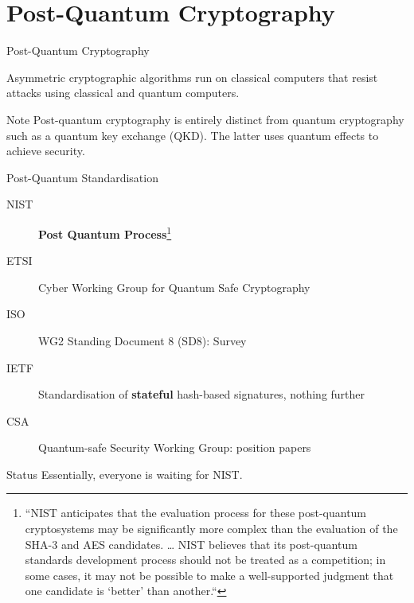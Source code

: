 \documentclass[xcolor=table,10pt,aspectratio=169]{beamer}
\begin{document}
\section{Post-Quantum Cryptography}
\label{sec:orgc3eb10c}
\begin{frame}[label={sec:org4dce0c8}]{Post-Quantum Cryptography}
\begin{definition}
Asymmetric cryptographic algorithms run on classical computers that resist attacks using classical and quantum computers.
\end{definition}

\pause

\begin{alertblock}{Note}
Post-quantum cryptography is entirely distinct from quantum cryptography such as a quantum key exchange (QKD). The latter uses quantum effects to achieve security.
\end{alertblock}
\end{frame}

\begin{frame}[label={sec:org1951ab1}]{Post-Quantum Standardisation}
\begin{description}
\item[{NIST}] \textbf{Post Quantum {\color{lightgray}{Competition} }Process}\footnote{“NIST anticipates that the evaluation process for these post-quantum cryptosystems may be significantly more complex than the evaluation of the SHA-3 and AES candidates. … NIST believes that its post-quantum standards development process should not be treated as a competition; in some cases, it may not be possible to make a well-supported judgment that one candidate is ‘better’ than another.“}
\item[{ETSI}] Cyber Working Group for Quantum Safe Cryptography
\item[{ISO}] WG2 Standing Document 8 (SD8): Survey
\item[{IETF}] Standardisation of \textbf{stateful} hash-based signatures, nothing further
\item[{CSA}] Quantum-safe Security Working Group: position papers
\end{description}

\pause

\begin{alertblock}{Status}
Essentially, everyone is waiting for NIST.
\end{alertblock}
\end{frame}
\end{document}
